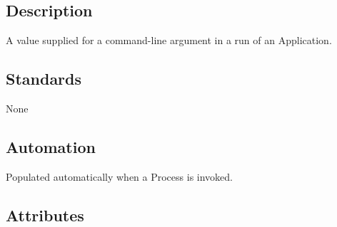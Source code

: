 \subsection{Description}\label{description-2}

A value supplied for a command-line argument in a run of an Application.

\subsection{Standards}\label{standards-3}

None

\subsection{Automation}\label{automation-3}

Populated automatically when a Process is invoked.

\subsection{Attributes}\label{attributes-4}

